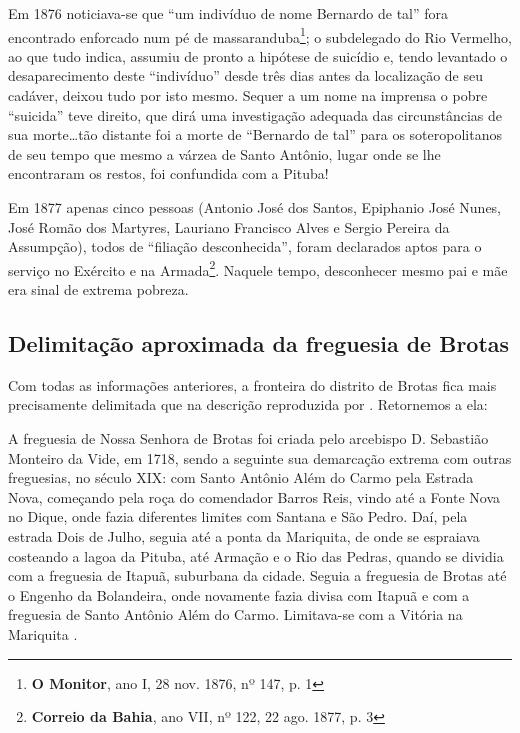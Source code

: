 Em 1876 noticiava-se que ``um indivíduo de nome Bernardo de tal'' fora encontrado enforcado num pé de massaranduba\footnote{\textbf{O Monitor}, ano I, 28 nov. 1876, nº 147, p. 1}; o subdelegado do Rio Vermelho, ao que tudo indica, assumiu de pronto a hipótese de suicídio e, tendo levantado o desaparecimento deste ``indivíduo'' desde três dias antes da localização de seu cadáver, deixou tudo por isto mesmo. Sequer a um nome na imprensa o pobre ``suicida'' teve direito, que dirá uma investigação adequada das circunstâncias de sua morte\dots tão distante foi a morte de ``Bernardo de tal'' para os soteropolitanos de seu tempo que mesmo a várzea de Santo Antônio, lugar onde se lhe encontraram os restos, foi confundida com a Pituba!

Em 1877 apenas cinco pessoas (Antonio José dos Santos, Epiphanio José Nunes, José Romão dos Martyres, Lauriano Francisco Alves e Sergio Pereira da Assumpção), todos de ``filiação desconhecida'', foram declarados aptos para o serviço no Exército e na Armada\footnote{\textbf{Correio da Bahia}, ano VII, nº 122, 22 ago. 1877, p. 3}. Naquele tempo, desconhecer mesmo pai e mãe era sinal de extrema pobreza.

\subsection{Delimitação aproximada da freguesia de Brotas}

Com todas as informações anteriores, a fronteira do distrito de Brotas fica mais precisamente delimitada que na descrição reproduzida por . Retornemos a ela:

\begin{citacao}
A freguesia de Nossa Senhora de Brotas foi criada pelo arcebispo D. Sebastião Monteiro da Vide, em 1718, sendo a seguinte sua demarcação extrema com outras freguesias, no século XIX: com Santo Antônio Além do Carmo pela Estrada Nova, começando pela roça do comendador Barros Reis, vindo até a Fonte Nova no Dique, onde fazia diferentes limites com Santana e São Pedro. Daí, pela estrada Dois de Julho, seguia até a ponta da Mariquita, de onde se espraiava costeando a lagoa da Pituba, até Armação e o Rio das Pedras, quando se dividia com a freguesia de Itapuã, suburbana da cidade. Seguia a freguesia de Brotas até o Engenho da Bolandeira, onde novamente fazia divisa com Itapuã e com a freguesia de Santo Antônio Além do Carmo. Limitava-se com a Vitória na Mariquita \cite[p.~58]{NASCIMENTO2007}.
\end{citacao}

